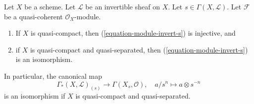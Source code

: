 \begin{lemma}
\label{lemma-invert-s-sections}
Let $X$ be a scheme. Let $\mathcal{L}$ be an invertible sheaf on $X$.
Let $s \in \Gamma(X, \mathcal{L})$. Let $\mathcal{F}$ be a quasi-coherent
$\mathcal{O}_X$-module.
\begin{enumerate}
\item If $X$ is quasi-compact, then (\ref{equation-module-invert-s})
is injective, and
\item if $X$ is quasi-compact and quasi-separated, then
(\ref{equation-module-invert-s}) is an isomorphism.
\end{enumerate}
In particular, the canonical map
$$
\Gamma_*(X, \mathcal{L})_{(s)}
\longrightarrow
\Gamma(X_s, \mathcal{O}),\quad
a/s^n \longmapsto a \otimes s^{-n}
$$
is an isomorphism if $X$ is quasi-compact and quasi-separated.
\end{lemma}

